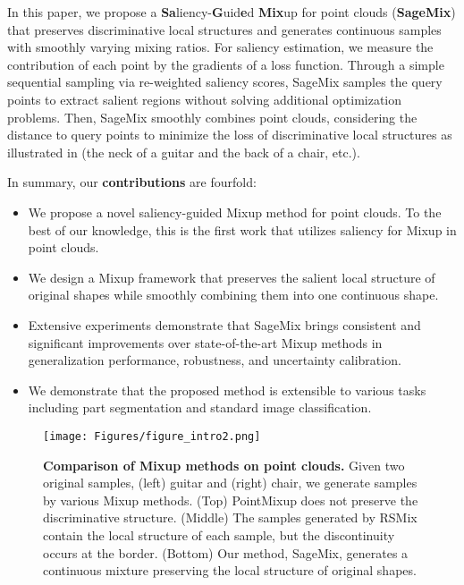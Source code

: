 \documentclass{article}
\begin{document}
In this paper, we propose a \textbf{Sa}liency-\textbf{G}uid\textbf{e}d \textbf{Mix}up for point clouds (\textbf{SageMix}) that preserves discriminative local structures and generates continuous samples with smoothly varying mixing ratios.
For saliency estimation, we measure the contribution of each point by the gradients of a loss function.
Through a simple sequential sampling via re-weighted saliency scores, SageMix samples the query points to extract salient regions without solving additional optimization problems.
Then, SageMix smoothly combines point clouds, considering the distance to query points to minimize the loss of discriminative local structures as illustrated in  (\eg the neck of a guitar and the back of a chair, etc.).

In summary, our \textbf{contributions} are fourfold:
\begin{itemize}
    \item We propose a novel saliency-guided Mixup method for point clouds. To the best of our knowledge, this is the first work that utilizes saliency for Mixup in point clouds.
    \item We design a Mixup framework that preserves the salient local structure of original shapes while smoothly combining them into one continuous shape.
    \item Extensive experiments demonstrate that SageMix brings consistent and significant improvements over state-of-the-art Mixup methods in generalization performance, robustness, and uncertainty calibration. \item We demonstrate that the proposed method is extensible to various tasks including part segmentation and standard image classification.
\end{itemize}
\begin{figure}[t]
\centering
\texttt{[image: Figures/figure\_intro2.png]}
\caption{\textbf{Comparison of Mixup methods on point clouds.} Given two original samples, (left) guitar and (right) chair, we generate samples by various Mixup methods. (Top) PointMixup does not preserve the discriminative structure. (Middle) The samples generated by RSMix contain the local structure of each sample, but the discontinuity occurs at the border. (Bottom) Our method, SageMix, generates a continuous mixture preserving the local structure of original shapes.}
\label{fig:figure_intro}
\end{figure} 

%
\end{document}

